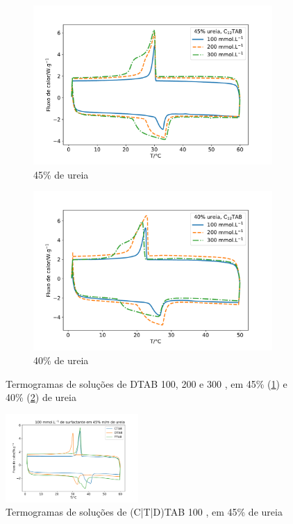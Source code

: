 		\begin{figure}[h]
			\centering
			\begin{subfigure}[t]{0.45\textwidth}
				\includegraphics[width=\textwidth]{./imagens/dsc/DTAB_45p}
				\caption{45\% de ureia}
				\label{fig:DSC_DTAB_UR45}
			\end{subfigure} \qquad %
			\begin{subfigure}[t]{0.45\textwidth}
				\includegraphics[width=\textwidth]{./imagens/dsc/DTAB_40p}
				\caption{40\% de ureia}
				\label{fig:DSC_DTAB_UR40}
			\end{subfigure}
			\caption{Termogramas de soluções de DTAB 100, 200 e 300 \mM{}, em 45\% (\ref{fig:DSC_DTAB_UR45}) e 40\% (\ref{fig:DSC_DTAB_UR40}) de ureia}
			\label{fig:DSC_DTAB_UR_40-45}
		\end{figure}
		
		
		\begin{figure}[h]
			\centering
			\includegraphics[width=0.45\textwidth]{./imagens/dsc/Surf_100mm_45p}
			\caption{Termogramas de soluções de (C|T|D)TAB 100 \mM{}, em 45\% de ureia}
			\label{fig:DSC_Surf_100mm_45p}
		\end{figure}
	
